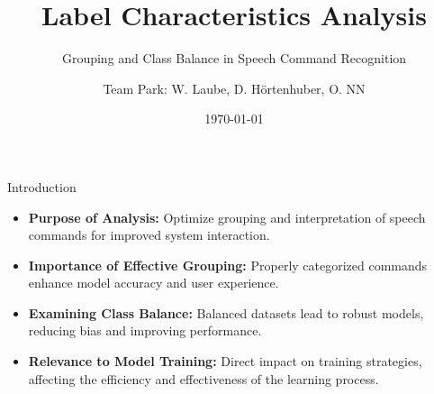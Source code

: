 \documentclass{beamer}
\title{Label Characteristics Analysis}
\subtitle{Grouping and Class Balance in Speech Command Recognition}
\author{Team Park: W. Laube, D. Hörtenhuber, O. NN}
\institute{JKU \\ MLPC}
\date{\today}
\begin{document}
\begin{frame}
  \titlepage
\end{frame}

\begin{frame}{Introduction}
  \begin{itemize}
    \item \textbf{Purpose of Analysis:} Optimize grouping and interpretation of speech commands for improved system interaction.
    \item \textbf{Importance of Effective Grouping:} Properly categorized commands enhance model accuracy and user experience.
    \item \textbf{Examining Class Balance:} Balanced datasets lead to robust models, reducing bias and improving performance.
    \item \textbf{Relevance to Model Training:} Direct impact on training strategies, affecting the efficiency and effectiveness of the learning process.
  \end{itemize}
\end{frame}
\end{document}

